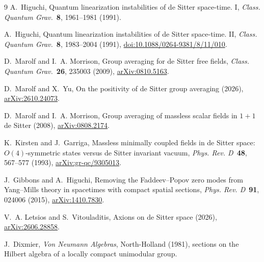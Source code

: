 \documentclass[11pt]{article}
\numberwithin{equation}{section}
\begin{document}
\begin{thebibliography}{9}
A.~Higuchi, Quantum linearization instabilities of de Sitter
space-time. I, \emph{Class. Quantum Grav.}\ \textbf{8},
1961--1981 (1991).

A.~Higuchi, Quantum linearization instabilities of de Sitter
space-time. II, \emph{Class. Quantum Grav.}\ \textbf{8},
1983--2004 (1991),
\href{https://doi.org/10.1088/0264-9381/8/11/010}{doi:10.1088/0264-9381/8/11/010}.

D.~Marolf and I.~A. Morrison, Group averaging for de Sitter free
fields, \emph{Class. Quantum Grav.}\ \textbf{26}, 235003 (2009),
\href{https://arxiv.org/abs/0810.5163}{arXiv:0810.5163}.

D.~Marolf and X.~Yu, On the positivity of de Sitter group
averaging (2026), \href{https://arxiv.org/abs/2610.24073}{arXiv:2610.24073}.

D.~Marolf and I.~A. Morrison, Group averaging of massless scalar
fields in \(1+1\) de Sitter (2008),
\href{https://arxiv.org/abs/0808.2174}{arXiv:0808.2174}.

K.~Kirsten and J.~Garriga, Massless minimally coupled fields in
de Sitter space: \(O(4)\)-symmetric states versus de Sitter invariant
vacuum, \emph{Phys. Rev. D}\ \textbf{48}, 567--577 (1993),
\href{https://arxiv.org/abs/gr-qc/9305013}{arXiv:gr-qc/9305013}.

J.~Gibbons and A.~Higuchi, Removing the Faddeev--Popov zero modes
from Yang--Mills theory in spacetimes with compact spatial sections,
\emph{Phys. Rev. D}\ \textbf{91}, 024006 (2015),
\href{https://arxiv.org/abs/1410.7830}{arXiv:1410.7830}.

V.~A. Letsios and S.~Vitouladitis, Axions on de Sitter space
(2026), \href{https://arxiv.org/abs/2606.28858}{arXiv:2606.28858}.

J.~Dixmier, \emph{Von Neumann Algebras}, North-Holland (1981),
sections on the Hilbert algebra of a locally compact unimodular group.
\end{thebibliography}
\end{document}
